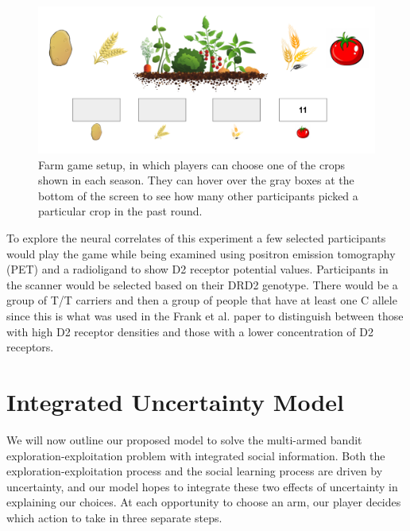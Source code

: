 \documentclass[11pt, a4paper]{article}
\begin{document}
\begin{figure}[h]
\centering
\includegraphics[scale=0.4]{farm.png}
\caption{Farm game setup, in which players can choose one of the crops shown in each season. They can hover over the gray boxes at the bottom of the screen to see how many other participants picked a particular crop in the past round.}
\end{figure}

To explore the neural correlates of this experiment a few selected participants would play the game while being examined using positron emission tomography (PET) and a radioligand to show D2 receptor potential values. Participants in the scanner would be selected based on their DRD2 genotype. There would be a group of T/T carriers and then a group of people that have at least one C allele since this is what was used in the Frank et al. paper to distinguish between those with high D2 receptor densities and those with a lower concentration of D2 receptors. 

\section{Integrated Uncertainty Model}

We will now outline our proposed model to solve the multi-armed bandit exploration-exploitation problem with integrated social information. Both the exploration-exploitation process and the social learning process are driven by uncertainty, and our model hopes to integrate these two effects of uncertainty in explaining our choices. At each opportunity to choose an arm, our player decides which action to take in three separate steps.
\end{document}
